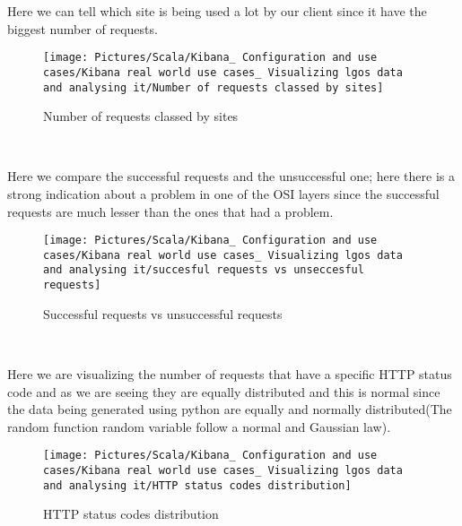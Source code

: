 \begin{spacing}{1.2}
\par Here we can tell which site is being used a lot by our client since it have the biggest number of requests.
\\
\begin{figure}[!htb] 
\begin{center} 
\texttt{[image: Pictures/Scala/Kibana\_ Configuration and use cases/Kibana real world use cases\_ Visualizing lgos data and analysing it/Number of requests classed by sites]} 
\end{center} 
\caption{Number of requests classed by sites} 
\end{figure}  \FloatBarrier
\\


\par 
Here we compare the successful requests and the unsuccessful one; here there is a strong indication about a problem in one of the OSI layers since the successful requests are much lesser than the ones that had a problem.
\\

\begin{figure}[!htb] 
\begin{center} 
\texttt{[image: Pictures/Scala/Kibana\_ Configuration and use cases/Kibana real world use cases\_ Visualizing lgos data and analysing it/succesful requests vs unseccesful requests]} 
\end{center} 
\caption{Successful requests vs unsuccessful requests} 
\end{figure}  \FloatBarrier
\\


\par Here we are visualizing the number of requests that have a specific HTTP status code and as we are seeing they are equally distributed and this is normal since the data being generated using python are equally and normally distributed(The random function random variable follow a normal and Gaussian law).
\\
\begin{figure}[!htb] 
\begin{center} 
\texttt{[image: Pictures/Scala/Kibana\_ Configuration and use cases/Kibana real world use cases\_ Visualizing lgos data and analysing it/HTTP status codes distribution]} 
\end{center} 
\caption{HTTP status codes distribution} 
\end{figure}  \FloatBarrier
\newpage


\end{spacing}
